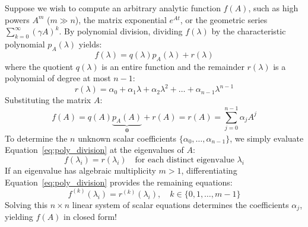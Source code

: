 Suppose we wish to compute an arbitrary analytic function $f(A)$, such as high powers $A^m$ ($m \gg n$), the matrix exponential $e^{At}$, or the geometric series $\sum_{k=0}^\infty (\gamma A)^k$. By polynomial division, dividing $f(\lambda)$ by the characteristic polynomial $p_A(\lambda)$ yields:
\begin{equation}
f(\lambda) = q(\lambda) p_A(\lambda) + r(\lambda)
\label{eq:poly_division}
\end{equation}
where the quotient $q(\lambda)$ is an entire function and the remainder $r(\lambda)$ is a polynomial of degree at most $n - 1$:
\begin{equation}
r(\lambda) = \alpha_0 + \alpha_1 \lambda + \alpha_2 \lambda^2 + \dots + \alpha_{n-1} \lambda^{n-1}
\end{equation}
Substituting the matrix $A$:
\begin{equation}
f(A) = q(A) \underbrace{p_A(A)}_{\mathbf{0}} + r(A) = r(A) = \sum_{j=0}^{n-1} \alpha_j A^j
\label{eq:matrix_func_reduction}
\end{equation}
To determine the $n$ unknown scalar coefficients $\{\alpha_0, \dots, \alpha_{n-1}\}$, we simply evaluate Equation~\eqref{eq:poly_division} at the eigenvalues of $A$:
\begin{equation}
f(\lambda_i) = r(\lambda_i) \quad \text{for each distinct eigenvalue } \lambda_i
\end{equation}
If an eigenvalue has algebraic multiplicity $m > 1$, differentiating Equation~\eqref{eq:poly_division} provides the remaining equations:
\begin{equation}
f^{(k)}(\lambda_i) = r^{(k)}(\lambda_i), \quad k \in \{0, 1, \dots, m-1\}
\end{equation}
Solving this $n \times n$ linear system of scalar equations determines the coefficients $\alpha_j$, yielding $f(A)$ in closed form!

